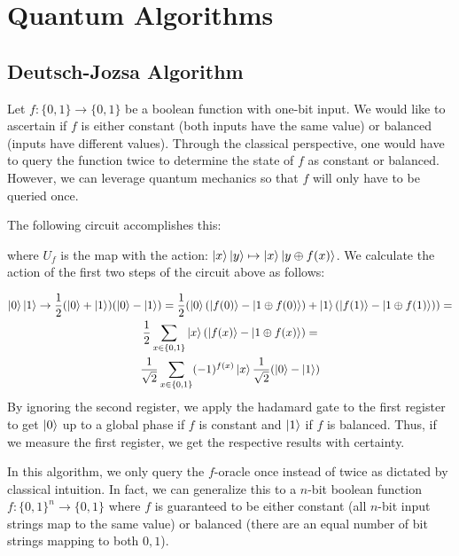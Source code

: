 \documentclass{../quantum.tex}
\begin{document}
\section{Quantum Algorithms}

\subsection{Deutsch-Jozsa Algorithm}

Let $f: \{0,1\} \rightarrow \{0,1\}$ be a boolean function with one-bit input. We would like to ascertain if $f$ is either constant (both inputs have the same value) or balanced (inputs have different values). Through the classical perspective, one would have to query the function twice to determine the state of $f$ as constant or balanced. However, we can leverage quantum mechanics so that $f$ will only have to be queried once.

The following circuit accomplishes this:

\begin{figure}[h]
    \centering
\end{figure}

where $U_f$ is the map with the action: $\ket{x}\ket{y} \mapsto \ket{x}\ket{y \oplus f(x)}$. We calculate the action of the first two steps of the circuit above as follows:

\begin{gather}
  \ket{0}\ket{1} \rightarrow \frac{1}{2}(\ket{0} + \ket{1})(\ket{0} - \ket{1}) = \frac{1}{2}(\ket{0}(\ket{f(0)} - \ket{1 \oplus f(0)}) + \ket{1}(\ket{f(1)} - \ket{1 \oplus f(1)})) = \\
  \frac{1}{2}\sum_{x \in \{0,1\}} \ket{x}(\ket{f(x)} - \ket{1 \oplus f(x)}) = \\
  \frac{1}{\sqrt{2}} \sum_{x \in \{0,1\}} (-1)^{f(x)}\ket{x} \frac{1}{\sqrt{2}}(\ket{0} -
  \ket{1})
\end{gather}
By ignoring the second register, we apply the hadamard gate to the first register to get $\ket{0}$ up to a global phase if $f$ is constant and $\ket{1}$ if $f$ is balanced. Thus, if we measure the first register, we get the respective results with certainty.

In this algorithm, we only query the $f$-oracle once instead of twice as dictated by classical intuition. In fact, we can generalize this to a $n$-bit boolean function $f:\{0,1\}^n \rightarrow \{0,1\}$ where $f$ is guaranteed to be either constant (all $n$-bit input strings map to the same value) or balanced (there are an equal number of bit strings mapping to both $0,1$).
\end{document}
